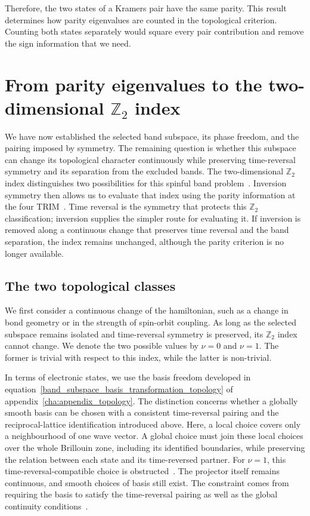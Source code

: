 Therefore, the two states of a Kramers pair have the same parity.
This result determines how parity eigenvalues are counted in the topological criterion.
Counting both states separately would square every pair contribution and remove the sign information that we need.

\newpage
\FloatBarrier
\section{From parity eigenvalues to the two-dimensional \texorpdfstring{$\mathbb{Z}_2$}{Z2} index}
\label{sec:fu_kane_criterion_topology}

We have now established the selected band subspace, its phase freedom, and the pairing imposed by symmetry.
The remaining question is whether this subspace can change its topological character continuously while preserving time-reversal symmetry and its separation from the excluded bands.
The two-dimensional $\mathbb{Z}_2$ index distinguishes two possibilities for this spinful band problem~\cite{kane2005z2}.
Inversion symmetry then allows us to evaluate that index using the parity information at the four TRIM~\cite{wieder2022topological}.
Time reversal is the symmetry that protects this $\mathbb{Z}_2$ classification;
inversion supplies the simpler route for evaluating it.
If inversion is removed along a continuous change that preserves time reversal and the band separation,
the index remains unchanged, although the parity criterion is no longer available.

\FloatBarrier
\subsection{The two topological classes}

We first consider a continuous change of the hamiltonian,
such as a change in bond geometry or in the strength of spin-orbit coupling.
As long as the selected subspace remains isolated and time-reversal symmetry is preserved,
its $\mathbb{Z}_2$ index cannot change.
We denote the two possible values by $\nu=0$ and $\nu=1$.
The former is trivial with respect to this index, while the latter is non-trivial.

In terms of electronic states, we use the basis freedom developed in equation~\eqref{band_subspace_basis_transformation_topology} of appendix~\ref{cha:appendix_topology}.
The distinction concerns whether a globally smooth basis can be chosen
with a consistent time-reversal pairing and the reciprocal-lattice identification introduced above.
Here, a local choice covers only a neighbourhood of one wave vector.
A global choice must join these local choices over the whole Brillouin zone, including its identified boundaries,
while preserving the relation between each state and its time-reversed partner.
For $\nu=1$, this time-reversal-compatible choice is obstructed~\cite{fu2006time}.
The projector itself remains continuous, and smooth choices of basis still exist.
The constraint comes from requiring the basis to satisfy the time-reversal pairing as well as the global continuity conditions~\cite{kane2005z2}.

